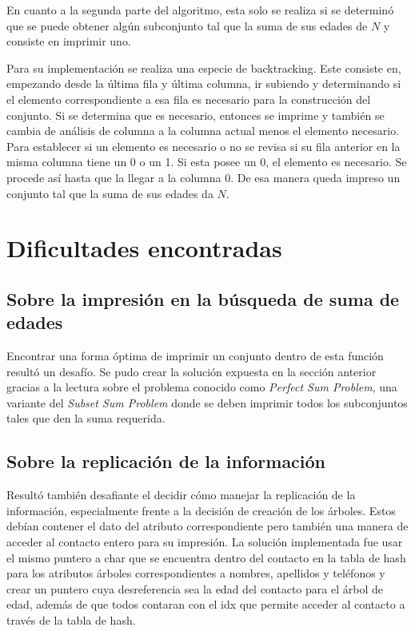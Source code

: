 \documentclass[11pt]{article}
\begin{document}
    En cuanto a la segunda parte del algoritmo, esta solo se realiza si se determin\'o que se puede obtener alg\'un subconjunto tal que la suma de sus edades de $N$ y consiste en imprimir uno.

    Para su implementaci\'on se realiza una especie de backtracking. Este consiste en, empezando desde la \'ultima fila y \'ultima columna, ir subiendo y determinando si el elemento correspondiente a esa fila es necesario para la construcci\'on del conjunto. Si se determina que es necesario, entonces se imprime y tambi\'en se cambia de an\'alisis de columna a la columna actual menos el elemento necesario.
    Para establecer si un elemento es necesario o no se revisa si su fila anterior en la misma columna tiene un 0 o un 1. Si esta posee un 0, el elemento es necesario. Se procede as\'i hasta que la llegar a la columna 0. De esa manera queda impreso un conjunto tal que la suma de sus edades da $N$.

\section{Dificultades encontradas}

    \subsection{Sobre la impresi\'on en la b\'usqueda de suma de edades}
    Encontrar una forma \'optima de imprimir un conjunto dentro de esta funci\'on result\'o un desaf\'io. Se pudo crear la soluci\'on expuesta en la secci\'on anterior gracias a la lectura sobre el problema conocido como \emph{Perfect Sum Problem}, una variante del \emph{Subset Sum Problem} donde se deben imprimir todos los subconjuntos tales que den la suma requerida.

    \subsection{Sobre la replicaci\'on de la informaci\'on}
    Result\'o tambi\'en desafiante el decidir c\'omo manejar la replicaci\'on de la informaci\'on, especialmente frente a la decisi\'on de creaci\'on de los \'arboles. 
    Estos deb\'ian contener el dato del atributo correspondiente pero tambi\'en una manera de acceder al contacto entero para su impresi\'on. 
    La soluci\'on implementada fue usar el mismo puntero a char que se encuentra dentro del contacto en la tabla de hash para los atributos \'arboles correspondientes a 
    nombres, apellidos y tel\'efonos y crear un puntero cuya desreferencia sea la edad del contacto para el \'arbol de edad, adem\'as de que todos contaran con el idx que permite acceder 
    al contacto a trav\'es de la tabla de hash.
\end{document}
